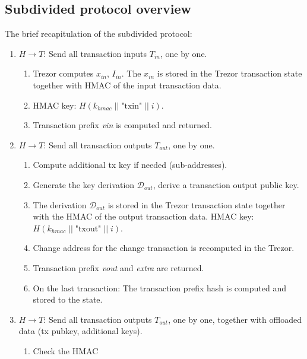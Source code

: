 \documentclass[]{article}
\begin{document}
\subsection{Subdivided protocol overview}

The brief recapitulation of the subdivided protocol:

\begin{enumerate}
	\item $H \rightarrow T$: Send all transaction inputs $T_{in}$, one by one.
	\begin{enumerate}
		\item Trezor computes $x_{in}$, $I_{in}$. The $x_{in}$ is stored in the Trezor transaction state together with HMAC of the input transaction data.
		
		\item HMAC key: $H(k_{hmac} \; || \; \text{"txin"} \; || \; i)$.
		
		\item Transaction prefix \emph{vin} is computed and returned.
	\end{enumerate} 
	
	\item $H \rightarrow T$: Send all transaction outputs $T_{out}$, one by one.
	\begin{enumerate}
		\item Compute additional tx key if needed (sub-addresses).
		
		\item Generate the key derivation $\mathcal{D}_{out}$, derive a transaction output public key.
		
        \item The derivation $\mathcal{D}_{out}$ is stored in the Trezor transaction state together with the HMAC of the output transaction data.
		HMAC key: $H(k_{hmac} \; || \; \text{"txout"} \; || \; i)$.
		
		\item Change address for the change transaction is recomputed in the Trezor.
		
		\item Transaction prefix \emph{vout} and \emph{extra} are returned. 
		
		\item On the last transaction: The transaction prefix hash is computed and stored to the state.
	\end{enumerate}
	  
	\item $H \rightarrow T$: Send all transaction outputs $T_{out}$, one by one, together with offloaded data (tx pubkey, additional keys). 
	\begin{enumerate}
		\item Check the HMAC
		

\end{enumerate}
\end{enumerate}
\end{document}

